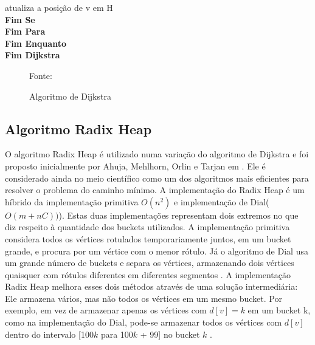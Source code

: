 {\begin{minipage}{70ex}
\vspace*{-1mm} \phantom{} \hspace{12ex} atualiza a posição de v em H\\
\vspace*{-1mm} \phantom{} \hspace{9ex} {\bf Fim Se}\\
\vspace*{-1mm} \phantom{} \hspace{6ex} {\bf Fim Para}\\
\vspace*{-1mm} \phantom{} \hspace{3ex} {\bf Fim Enquanto}\\
\vspace*{-1mm} \phantom{} \hspace{0ex} {\bf Fim Dijkstra}\\
\end{minipage}}
\begin{figure}[htbp]
\centering
\caption{Algoritmo de Dijkstra}
Fonte: \cite{cormen}
\label{fig:codeRadix}
\end{figure}

% 

\subsection{Algoritmo Radix Heap}
O algoritmo Radix Heap é utilizado numa variação do algoritmo de Dijkstra e foi proposto inicialmente por
Ahuja, Mehlhorn, Orlin e Tarjan em \cite{ahuja}.
Ele é considerado ainda no meio científico como um dos algoritmos mais eficientes para resolver o
problema do caminho mínimo.
A implementação do Radix Heap é um híbrido da implementação primitiva $O(n^2)$ e implementação de Dial($O(m + nC))$). 
Estas duas implementações representam dois extremos no que diz respeito à quantidade dos buckets utilizados.
A implementação primitiva considera todos os vértices rotulados temporariamente juntos, em um bucket grande,
e procura por um vértice com o menor rótulo. Já o algoritmo de Dial usa um grande número de buckets e separa os vértices,
armazenando dois vértices quaisquer com rótulos diferentes em diferentes segmentos \cite{bookahuja}.
A implementação Radix Heap melhora esses dois métodos através de uma solução intermediária:
Ele armazena vários, mas não todos os vértices em um mesmo bucket. Por exemplo, em vez de armazenar
apenas os vértices com $d[v] = k$ em um bucket k, como na implementação do Dial,
pode-se armazenar todos os vértices com $d[v]$ dentro do intervalo [100$k$ para 100$k$ + 99] no bucket $k$ \cite{bookahuja}.

